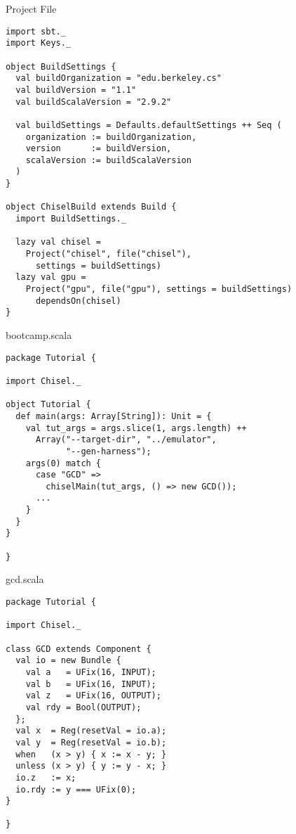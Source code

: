 \documentclass[xcolor=pdflatex,dvipsnames,table]{beamer}
\newenvironment{FramedVerb}%
{\VerbatimEnvironment
\begin{Sbox}\begin{minipage}{.94\textwidth}\begin{Verbatim}}%
{\end{Verbatim}\end{minipage}\end{Sbox}
\setlength{\fboxsep}{8pt}\fbox{\TheSbox}}
\begin{document}
\begin{frame}{Project File}
\begin{lstlisting}
import sbt._
import Keys._

object BuildSettings {
  val buildOrganization = "edu.berkeley.cs"
  val buildVersion = "1.1"
  val buildScalaVersion = "2.9.2"

  val buildSettings = Defaults.defaultSettings ++ Seq (
    organization := buildOrganization,
    version      := buildVersion,
    scalaVersion := buildScalaVersion
  )
}

object ChiselBuild extends Build {
  import BuildSettings._

  lazy val chisel = 
    Project("chisel", file("chisel"), 
      settings = buildSettings)
  lazy val gpu =
    Project("gpu", file("gpu"), settings = buildSettings) 
      dependsOn(chisel)
}
\end{lstlisting}
\end{frame}

\begin{frame}{bootcamp.scala}
\begin{lstlisting}
package Tutorial {

import Chisel._

object Tutorial {
  def main(args: Array[String]): Unit = { 
    val tut_args = args.slice(1, args.length) ++ 
      Array("--target-dir", "../emulator", 
            "--gen-harness");
    args(0) match {
      case "GCD" => 
        chiselMain(tut_args, () => new GCD());
      ...
    }
  }
}

}
\end{lstlisting}
\end{frame}

\begin{frame}{gcd.scala}
\begin{lstlisting}
package Tutorial {

import Chisel._

class GCD extends Component {
  val io = new Bundle {
    val a   = UFix(16, INPUT);
    val b   = UFix(16, INPUT);
    val z   = UFix(16, OUTPUT);
    val rdy = Bool(OUTPUT);
  };
  val x  = Reg(resetVal = io.a);
  val y  = Reg(resetVal = io.b);
  when   (x > y) { x := x - y; } 
  unless (x > y) { y := y - x; }
  io.z   := x;
  io.rdy := y === UFix(0);
}

}
\end{lstlisting}
\end{frame}
\end{document}
